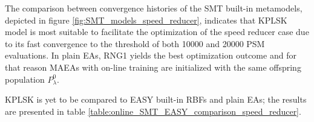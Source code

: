 \begin{table}[h!]
\centering
\caption{Speed reducer case with RNG1. Optimal candidate solution 
found using MAEAs with metamodels trained on-line via SMT}
\label{table:online_SMT_speed_reducer}
\end{table}

The comparison between convergence histories of the SMT built-in
metamodels, depicted in figure \ref{fig:SMT_models_speed_reducer},	 
indicates that KPLSK model is most suitable to 
facilitate the optimization of the speed reducer case due to its 
fast convergence to the threshold of both 10000 and 20000 PSM 
evaluations. In plain EAs, RNG1 yields the best optimization 
outcome and for that reason MAEAs with on-line training are 
initialized with the same offspring population $P_{λ}^{0}$.



\newpage


KPLSK is yet to be compared to EASY built-in RBFs and plain EAs; 
the results are presented in table 
\ref{table:online_SMT_EASY_comparison_speed_reducer}.

\begin{table}[h!]
\centering
\caption{Speed reducer case. Comparison between the outcome of the  
optimization using MAEAs with on-line training and plain EAs}
\label{table:online_SMT_EASY_comparison_speed_reducer}
\end{table}
  
